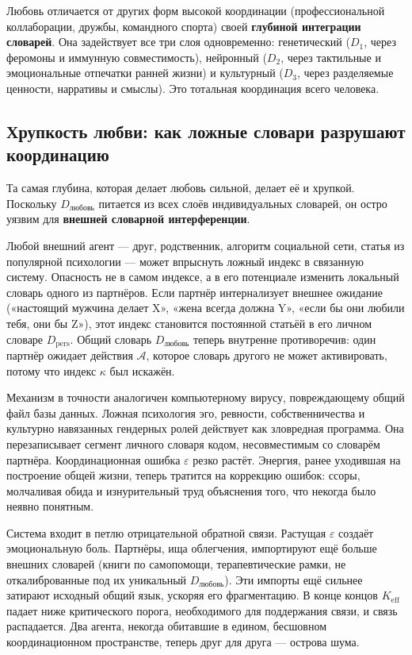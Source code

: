 \documentclass[12pt,a4paper]{article}
\begin{document}
	Любовь отличается от других форм высокой координации (профессиональной коллаборации, дружбы, командного спорта) своей \textbf{глубиной интеграции словарей}. Она задействует все три слоя одновременно: генетический (\(D_1\), через феромоны и иммунную совместимость), нейронный (\(D_2\), через тактильные и эмоциональные отпечатки ранней жизни) и культурный (\(D_3\), через разделяемые ценности, нарративы и смыслы). Это тотальная координация всего человека.
	
	\subsection{Хрупкость любви: как ложные словари разрушают координацию}
	
	Та самая глубина, которая делает любовь сильной, делает её и хрупкой. Поскольку \(D_{\text{любовь}}\) питается из всех слоёв индивидуальных словарей, он остро уязвим для \textbf{внешней словарной интерференции}.
	
	Любой внешний агент — друг, родственник, алгоритм социальной сети, статья из популярной психологии — может впрыснуть ложный индекс в связанную систему. Опасность не в самом индексе, а в его потенциале изменить локальный словарь одного из партнёров. Если партнёр интернализует внешнее ожидание («настоящий мужчина делает X», «жена всегда должна Y», «если бы они любили тебя, они бы Z»), этот индекс становится постоянной статьёй в его личном словаре \(D_{\text{pers}}\). Общий словарь \(D_{\text{любовь}}\) теперь внутренне противоречив: один партнёр ожидает действия \(\mathcal{A}\), которое словарь другого не может активировать, потому что индекс \(\kappa\) был искажён.
	
	Механизм в точности аналогичен компьютерному вирусу, повреждающему общий файл базы данных. Ложная психология эго, ревности, собственничества и культурно навязанных гендерных ролей действует как зловредная программа. Она перезаписывает сегмент личного словаря кодом, несовместимым со словарём партнёра. Координационная ошибка \(\varepsilon\) резко растёт. Энергия, ранее уходившая на построение общей жизни, теперь тратится на коррекцию ошибок: ссоры, молчаливая обида и изнурительный труд объяснения того, что некогда было неявно понятным.
	
	Система входит в петлю отрицательной обратной связи. Растущая \(\varepsilon\) создаёт эмоциональную боль. Партнёры, ища облегчения, импортируют ещё больше внешних словарей (книги по самопомощи, терапевтические рамки, не откалиброванные под их уникальный \(D_{\text{любовь}}\)). Эти импорты ещё сильнее затирают исходный общий язык, ускоряя его фрагментацию. В конце концов \(K_{\mathrm{eff}}\) падает ниже критического порога, необходимого для поддержания связи, и связь распадается. Два агента, некогда обитавшие в едином, бесшовном координационном пространстве, теперь друг для друга — острова шума.
	
\end{document}
